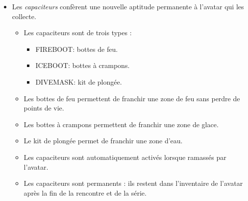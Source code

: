 \begin{itemize}
        \item Les \textit{capaciteurs} confèrent une nouvelle aptitude permanente à l'avatar qui les collecte. 
            \begin{itemize}
                \item Les capaciteurs sont de trois types :
                    \begin{itemize}
                        \item FIREBOOT: bottes de feu.
                        \item ICEBOOT: bottes à crampons.
                        \item DIVEMASK: kit de plongée.
                    \end{itemize}
                \item Les bottes de feu permettent de franchir une zone de feu sans perdre de points de vie.
                \item Les bottes à crampons permettent de franchir une zone de glace.
                \item Le kit de plongée permet de franchir une zone d'eau.
                \item Les capaciteurs sont automatiquement activés lorsque ramassés par l'avatar.
                \item Les capaciteurs sont permanents : ils restent dans l'inventaire de l'avatar après la fin de la rencontre et de la série.
            \end{itemize}
            

\end{itemize}
